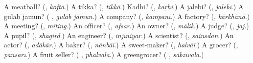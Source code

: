 \begin{tcolorbox}[breakable,colback=teal!4,colframe=teal!35!black,title={Before you move on}]
A meatball? (\textbf{}, \emph{koftā}.) A tikka? (\textbf{}, \emph{tikkā}.) Kadhi? (\textbf{}, \emph{kaṛhī}.) A jalebi? (\textbf{}, \emph{jalebī}.) A gulab jamun? (\textbf{ }, \emph{gulāb jāmun}.) A company? (\textbf{}, \emph{kampanī}.) A factory? (\textbf{}, \emph{kārkhānā}.) A meeting? (\textbf{}, \emph{mīṭing}.) An officer? (\textbf{}, \emph{afsar}.) An owner? (\textbf{}, \emph{mālik}.) A judge? (\textbf{}, \emph{jaj}.) A pupil? (\textbf{}, \emph{shāgird}.) An engineer? (\textbf{}, \emph{injīniyar}.) A scientist? (\textbf{}, \emph{sāinsdān}.) An actor? (\textbf{}, \emph{adākār}.) A baker? (\textbf{}, \emph{nānbāī}.) A sweet-maker? (\textbf{}, \emph{halvāī}.) A grocer? (\textbf{}, \emph{pansārī}.) A fruit seller? (\textbf{ }, \emph{phalvālā}.) A greengrocer? (\textbf{ }, \emph{sabzīvālā}.)
\end{tcolorbox}
